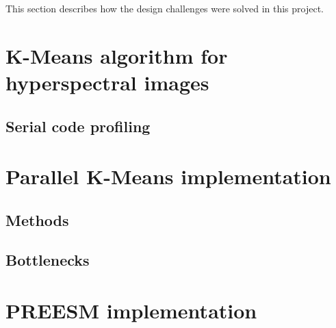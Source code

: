 This section describes how the design challenges were solved in this project.
    \section{K-Means algorithm for hyperspectral images}
    \subsection{Serial code profiling}
    \section{Parallel K-Means implementation}
     	\subsection{Methods}
     	\subsection{Bottlenecks}
    \section{PREESM implementation}
